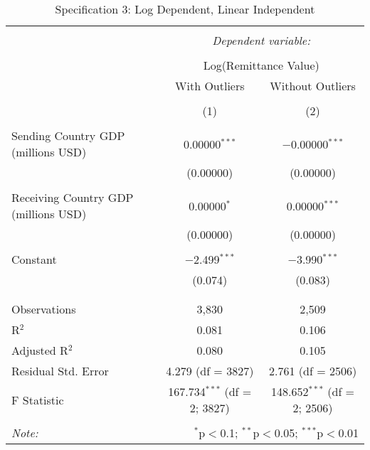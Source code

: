 
\begin{table}[!htbp] \centering 
  \caption{Specification 3: Log Dependent, Linear Independent} 
  \label{} 
\begin{tabular}{@{\extracolsep{5pt}}lcc} 
\\[-1.8ex]\hline 
\hline \\[-1.8ex] 
 & \multicolumn{2}{c}{\textit{Dependent variable:}} \\ 
\cline{2-3} 
\\[-1.8ex] & \multicolumn{2}{c}{Log(Remittance Value)} \\ 
 & With Outliers & Without Outliers \\ 
\\[-1.8ex] & (1) & (2)\\ 
\hline \\[-1.8ex] 
 Sending Country GDP (millions USD) & 0.00000$^{***}$ & $-$0.00000$^{***}$ \\ 
  & (0.00000) & (0.00000) \\ 
  & & \\ 
 Receiving Country GDP (millions USD) & 0.00000$^{*}$ & 0.00000$^{***}$ \\ 
  & (0.00000) & (0.00000) \\ 
  & & \\ 
 Constant & $-$2.499$^{***}$ & $-$3.990$^{***}$ \\ 
  & (0.074) & (0.083) \\ 
  & & \\ 
\hline \\[-1.8ex] 
Observations & 3,830 & 2,509 \\ 
R$^{2}$ & 0.081 & 0.106 \\ 
Adjusted R$^{2}$ & 0.080 & 0.105 \\ 
Residual Std. Error & 4.279 (df = 3827) & 2.761 (df = 2506) \\ 
F Statistic & 167.734$^{***}$ (df = 2; 3827) & 148.652$^{***}$ (df = 2; 2506) \\ 
\hline 
\hline \\[-1.8ex] 
\textit{Note:}  & \multicolumn{2}{r}{$^{*}$p$<$0.1; $^{**}$p$<$0.05; $^{***}$p$<$0.01} \\ 
\end{tabular} 
\end{table} 

